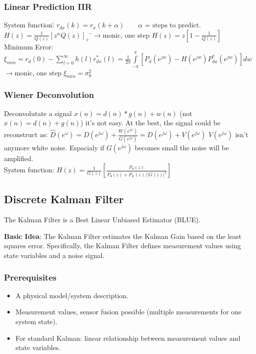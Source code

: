 \subsubsection{Linear Prediction IIR }
\begin{tabbing}
System function:\hspace{0.2cm}\=
	$ r_{dx}(k)=r_x(k+\alpha)  \qquad \alpha \text{ = steps to predict.} $\\
\>	$ H(z)= \frac{1}{Q(z)}[z^\alpha Q(z)]_+ $ \hspace{6.8cm} \=$\rightarrow \text{monic, one step } H(z) = z [1- \frac{1}{Q(z)}] $\\
Minimum Error:\>
	$\xi_{min} =r_d(0)-\sum \limits_{l=0}^\infty h(l)r_{dx}^{*}(l)
		=\frac{1}{2\pi}\int \limits_{-\pi}^\pi[P_d(e^{jw})-H(e^{jw})P_{dx}^{*}(e^{jw})]dw $\>$ \rightarrow \text{monic, one step } \xi_{min} = \sigma^2_0$\\
\end{tabbing}


\subsubsection{Wiener Deconvolution }
Deconvolutate a signal $x(n)=d(n)\ast g(n) + w(n)$ (not $x(n)=d(n) + g(n)$) it's not easy. At the best, the signal could be reconstruct as:
$\hat{D}(e^{\omega})=D(e^{j\omega}) + \frac{W(e^{j\omega})}{G(e^{j\omega})}=D(e^{j\omega})+V(e^{j\omega})$ \quad $V(e^{j\omega})$ isn't anymore white noise.
Espacialy if $G(e^{j\omega})$ becomes small the noise will be amplified.\\
System function:\hspace{1.2cm}
	$ H(z)= \frac{1}{G(z)}\left[\frac{P_d(z)}{P_d(z)+P_w(z)/|G(z)|^2}\right]$\\


\subsection{Discrete Kalman Filter}
The Kalman Filter is a Best Linear Unbiased Estimator (BLUE).

\textbf{Basic Idea}: The Kalman Filter estimates the Kalman Gain based on
the least squares error. Specifically, the Kalman Filter defines measurement values
using state variables and a noise signal. \\
\subsubsection{Prerequisites}
\begin{itemize}
	\item A physical model/system description.
	\item Measurement values, sensor fusion possible (multiple measurements for one
	system state).
	\item For standard Kalman: linear relationship between measurement values and
	state variables.
\end{itemize}


